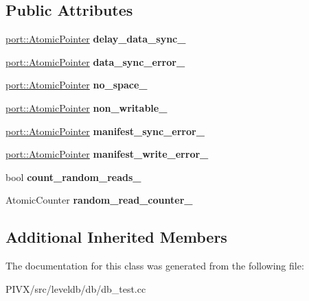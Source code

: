 \subsection*{Public Attributes}
\begin{DoxyCompactItemize}
\item 
\mbox{\label{classleveldb_1_1_special_env_af8a6a4d77f11f6986cb1d00f3cf9d37a}} 
\mbox{\hyperlink{classleveldb_1_1port_1_1_atomic_pointer}{port\+::\+Atomic\+Pointer}} {\bfseries delay\+\_\+data\+\_\+sync\+\_\+}
\item 
\mbox{\label{classleveldb_1_1_special_env_ae468cdabd36e0b9fde534bb25a47499f}} 
\mbox{\hyperlink{classleveldb_1_1port_1_1_atomic_pointer}{port\+::\+Atomic\+Pointer}} {\bfseries data\+\_\+sync\+\_\+error\+\_\+}
\item 
\mbox{\label{classleveldb_1_1_special_env_a21c9400bf22bd43f75349677b4d3413b}} 
\mbox{\hyperlink{classleveldb_1_1port_1_1_atomic_pointer}{port\+::\+Atomic\+Pointer}} {\bfseries no\+\_\+space\+\_\+}
\item 
\mbox{\label{classleveldb_1_1_special_env_a3ecf4339c101366198febb32cfe938f0}} 
\mbox{\hyperlink{classleveldb_1_1port_1_1_atomic_pointer}{port\+::\+Atomic\+Pointer}} {\bfseries non\+\_\+writable\+\_\+}
\item 
\mbox{\label{classleveldb_1_1_special_env_a354d87bbdeb456c36877e506872bcc04}} 
\mbox{\hyperlink{classleveldb_1_1port_1_1_atomic_pointer}{port\+::\+Atomic\+Pointer}} {\bfseries manifest\+\_\+sync\+\_\+error\+\_\+}
\item 
\mbox{\label{classleveldb_1_1_special_env_a7a6fafc967db1ba7594676d372b7fbec}} 
\mbox{\hyperlink{classleveldb_1_1port_1_1_atomic_pointer}{port\+::\+Atomic\+Pointer}} {\bfseries manifest\+\_\+write\+\_\+error\+\_\+}
\item 
\mbox{\label{classleveldb_1_1_special_env_aaf50860248689bda9993dfdcfb53855a}} 
bool {\bfseries count\+\_\+random\+\_\+reads\+\_\+}
\item 
\mbox{\label{classleveldb_1_1_special_env_a7cf0b2e4dcd63460e8776ae3a2c70bee}} 
Atomic\+Counter {\bfseries random\+\_\+read\+\_\+counter\+\_\+}
\end{DoxyCompactItemize}
\subsection*{Additional Inherited Members}


The documentation for this class was generated from the following file\+:\begin{DoxyCompactItemize}
\item 
P\+I\+V\+X/src/leveldb/db/db\+\_\+test.\+cc\end{DoxyCompactItemize}

